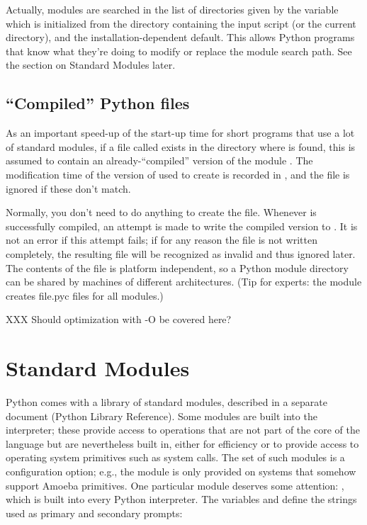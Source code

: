 Actually, modules are searched in the list of directories given by the 
variable  which is initialized from the directory 
containing the input script (or the current directory),
 and the installation-dependent default.  This allows
Python programs that know what they're doing to modify or replace the 
module search path.  See the section on Standard Modules later.

\subsection{``Compiled'' Python files}

As an important speed-up of the start-up time for short programs that
use a lot of standard modules, if a file called  exists
in the directory where  is found, this is assumed to
contain an already-``compiled'' version of the module .  The
modification time of the version of  used to create
 is recorded in , and the file is
ignored if these don't match.

Normally, you don't need to do anything to create the  file.
Whenever  is successfully compiled, an attempt is made to
write the compiled version to .  It is not an error if
this attempt fails; if for any reason the file is not written
completely, the resulting  file will be recognized as
invalid and thus ignored later.  The contents of the 
file is platform independent, so a Python module directory can be
shared by machines of different architectures.  (Tip for experts:
the module  creates file{.pyc} files for all modules.)

XXX Should optimization with -O be covered here?

\section{Standard Modules}

Python comes with a library of standard modules, described in a separate
document (Python Library Reference).  Some modules are built into the
interpreter; these provide access to operations that are not part of the
core of the language but are nevertheless built in, either for
efficiency or to provide access to operating system primitives such as
system calls.  The set of such modules is a configuration option; e.g.,
the  module is only provided on systems that somehow support
Amoeba primitives.  One particular module deserves some attention:
, which is built into every Python interpreter.  The
variables  and  define the strings used as
primary and secondary prompts:

